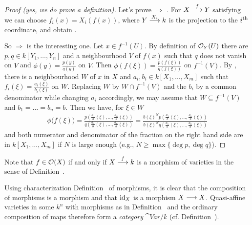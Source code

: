\documentclass[a4paper,parskip=half,numbers=enddot, DIV=12]{scrreprt}
\renewcommand{\geq}{\geqslant}
\begin{document}
	\begin{proof}[Proof (yes, we do prove a definition)]
	  Let's prove  $\Rightarrow$ . For $X\morphism[f]Y$ satisfying  we can choose $f_i(x) = X_i(f(x))$, where $Y\morphism[X_i] k$ is the projection to the $i^{\text{th}}$ coordinate, and obtain .
	  
	  So  $\Rightarrow$  is the interesting one. Let $x\in f^{-1}(U)$. By definition of $\mathcal{O}_Y(U)$ there are $p,q\in k[Y_1,\ldots, Y_n]$ and a neighbourhood $V$ of $f(x)$ such that $q$ does not vanish on $V$ and $\phi(y) = \frac{p(y)}{q(y)}$ on $V$. Then $\phi(f(\xi)) = \frac{p(f(\xi))}{q(f(\xi))}$ on $f^{-1}(V)$. By , there is a neighbourhood $W$ of $x$ in $X$ and $a_i,b_i\in k[X_1,\ldots, X_m]$ such that $f_i(\xi) = \frac{a_i(\xi)}{b_i(\xi)}$ on $W$. Replacing $W$ by $W\cap f^{-1}(V)$ and the $b_i$ by a common denominator while changing $a_i$ accordingly, we may assume that $W\subseteq f^{-1}(V)$ and $b_1=\ldots = b_n = b$. Then we have, for $\xi\in W$ 
	  \begin{align*}
	   \phi\big(f(\xi)\big) = \frac{p\left(\frac{a_1}{b}(\xi), \ldots, \frac{a_n}{b}(\xi)\right)}{q\left(\frac{a_1}{b}(\xi), \ldots, \frac{a_n}{b}(\xi)\right)}=  \frac{b(\xi)^N p\left(\frac{a_1}{b}(\xi), \ldots, \frac{a_n}{b}(\xi)\right)}{b(\xi)^Nq\left(\frac{a_1}{b}(\xi), \ldots, \frac{a_n}{b}(\xi)\right)}
	  \end{align*}
	  and both numerator and denominator of the fraction on the right hand side are in $k[X_1,\ldots,X_m]$ if $N$ is large enough (e.g., $N\geq \max\{\deg p, \deg q\}$).	\end{proof}
	\begin{rem}
	 \begin{alphanumerate}
	  \item Note that $f\in \mathcal{O}(X)$ if and only if $X\morphism[f] k$ is a morphism of varieties in the sense of Definition~.
	  \item Using characterization Definition~ of morphisms, it is clear that the composition of morphisms is a morphism and that $\operatorname{id}_X$ is a morphism $X\longrightarrow X$. Quasi-affine varieties in some $k^n$ with morphisms as in Definition~ and the ordinary composition of maps therefore form a \emph{category} $\cat{Var}/k$ (cf. Definition~).
	 \end{alphanumerate}
	\end{rem}
\end{document}

